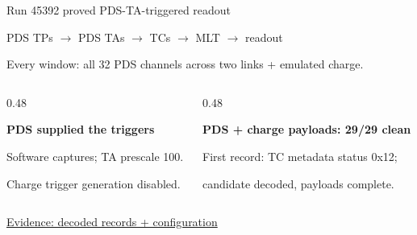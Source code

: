 \documentclass[aspectratio=169,11pt]{beamer}
\begin{document}
\begin{frame}{Run 45392 proved PDS-TA-triggered readout}
  \centering
  {\large PDS TPs $\rightarrow$ PDS TAs $\rightarrow$ TCs $\rightarrow$ MLT $\rightarrow$ readout\par}
  \bigskip
    {Every window: all 32 PDS channels across two links + emulated charge.}
  \bigskip
  \begin{columns}[T,onlytextwidth]
    \begin{column}{0.48\textwidth}
      \raggedright
      \textbf{PDS supplied the triggers}\par
      \smallskip
      \small Software captures; TA prescale 100.\par
      Charge trigger generation disabled.
    \end{column}
    \begin{column}{0.48\textwidth}
      \raggedright
      \textbf{PDS + charge payloads: 29/29 clean}\par
      \smallskip
      \small First record: TC metadata status 0x12;\par
      candidate decoded, payloads complete.
    \end{column}
  \end{columns}
  \bigskip
  {\footnotesize\color{DuneTextMuted}\href{https://github.com/DUNE/PDS/tree/bed0920192126456089d7d44930dbfb145268463/deployments/cern-daphne14/20261020}{Evidence: decoded records + configuration}\par}
\end{frame}
\end{document}
